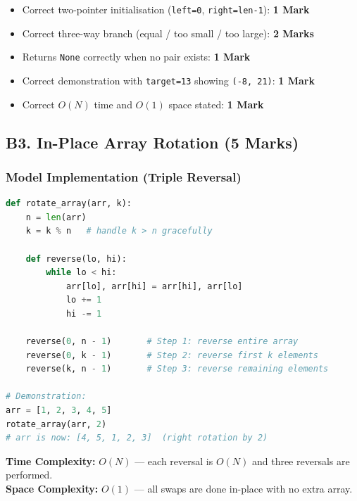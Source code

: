 \documentclass[11pt,a4paper]{article}
\newenvironment{markbox}[1]{%
    \begin{tcolorbox}[colback=markgreen!6!white, colframe=markgreen, title=\textbf{Mark Allocation --- #1}]
}{%
    \end{tcolorbox}
}
\begin{document}
\begin{markbox}{B2 --- 6 Marks}
\begin{itemize}
    \item Correct two-pointer initialisation (\texttt{left=0}, \texttt{right=len-1}): \textbf{1 Mark}
    \item Correct three-way branch (equal / too small / too large): \textbf{2 Marks}
    \item Returns \texttt{None} correctly when no pair exists: \textbf{1 Mark}
    \item Correct demonstration with \texttt{target=13} showing \texttt{(-8, 21)}: \textbf{1 Mark}
    \item Correct $O(N)$ time and $O(1)$ space stated: \textbf{1 Mark}
\end{itemize}
\end{markbox}

\newpage

\subsection*{B3. In-Place Array Rotation (5 Marks)}

\subsubsection*{Model Implementation (Triple Reversal)}
\begin{lstlisting}[language=Python]
def rotate_array(arr, k):
    n = len(arr)
    k = k % n   # handle k > n gracefully

    def reverse(lo, hi):
        while lo < hi:
            arr[lo], arr[hi] = arr[hi], arr[lo]
            lo += 1
            hi -= 1

    reverse(0, n - 1)       # Step 1: reverse entire array
    reverse(0, k - 1)       # Step 2: reverse first k elements
    reverse(k, n - 1)       # Step 3: reverse remaining elements

# Demonstration:
arr = [1, 2, 3, 4, 5]
rotate_array(arr, 2)
# arr is now: [4, 5, 1, 2, 3]  (right rotation by 2)
\end{lstlisting}

\textbf{Time Complexity:} $O(N)$ --- each reversal is $O(N)$ and three reversals are performed. \\
\textbf{Space Complexity:} $O(1)$ --- all swaps are done in-place with no extra array.
\end{document}
